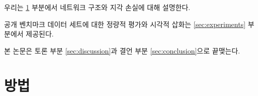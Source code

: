 \documentclass[10pt,twocolumn,letterpaper]{article}
\newcommand{\kor}[1]{#1}
\newcommand{\eng}[1]{}
\begin{document}

\eng{
We describe the network architecture and the perceptual loss in Section \ref{sec:method}.
}\kor{
우리는 \ref{sec:method} 부분에서 네트워크 구조와 지각 손실에 대해 설명한다.
} \eng{
A quantitative evaluation on public benchmark datasets as well as visual illustrations are provided in Section \ref{sec:experiments}.
}\kor{
공개 벤치마크 데이터 세트에 대한 정량적 평가와 시각적 삽화는 \ref{sec:experiments} 부분에서 제공된다.
} \eng{
The paper concludes with a discussion in Section \ref{sec:discussion} and concluding remarks in Section \ref{sec:conclusion}.
}\kor{
본 논문은 토론 부분 \ref{sec:discussion}과 결언 부분 \ref{sec:conclusion}으로 끝맺는다.
}

\section{\eng{Method}\kor{방법}}
\label{sec:method}
\end{document}
